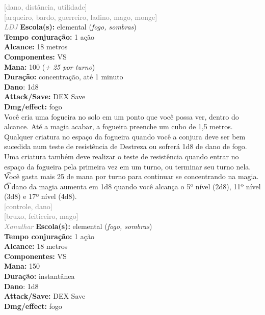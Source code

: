 \documentclass{RPG_Adventure}[2021/10/20]
\begin{document}
{\scriptsize \textcolor{gray}{[dano, distância, utilidade]\\}}
{\scriptsize \textcolor{gray}{[arqueiro, bardo, guerreiro, ladino, mago, monge]\\}}
{\tiny \textcolor{gray}{\textit{LDJ}}}
{\small \t \textbf{Escola(s):} elemental (\textit{fogo, sombras})\\\t \textbf{Tempo conjuração:} 1 ação\\\t \textbf{Alcance:} 18 metros\\\t \textbf{Componentes:} VS\\\t \textbf{Mana:} 100 (\textit{+ 25 por turno})\\\t \textbf{Duração:} concentração, até 1 minuto\\\t \textbf{Dano}: 1d8\\\t \textbf{Attack/Save:} DEX Save\\\t \textbf{Dmg/effect:} fogo\\}
{\normalsize Você cria uma fogueira no solo em um ponto que você possa ver, dentro do alcance. Até a magia acabar, a fogueira preenche um cubo de 1,5 metros. Qualquer criatura no espaço da fogueira quando você a conjura deve ser bem sucedida num teste de resistência de Destreza ou sofrerá 1d8 de dano de fogo. Uma criatura também deve realizar o teste de resistência quando entrar no espaço da fogueira pela primeira vez em um turno, ou terminar seu turno nela.\\\t Você gasta mais 25 de mana por turno para continuar se concentrando na magia.\\\t O dano da magia aumenta em 1d8 quando você alcança o 5º nível (2d8), 11º nível (3d8) e 17º nível (4d8).\\}
{\scriptsize \textcolor{gray}{[controle, dano]\\}}
{\scriptsize \textcolor{gray}{[bruxo, feiticeiro, mago]\\}}
{\tiny \textcolor{gray}{\textit{Xanathar}}}
{\small \t \textbf{Escola(s):} elemental (\textit{fogo, sombras})\\\t \textbf{Tempo conjuração:} 1 ação\\\t \textbf{Alcance:} 18 metros\\\t \textbf{Componentes:} VS\\\t \textbf{Mana:} 150\\\t \textbf{Duração:} instantânea\\\t \textbf{Dano}: 1d8\\\t \textbf{Attack/Save:} DEX Save\\\t \textbf{Dmg/effect:} fogo\\}
\end{document}

